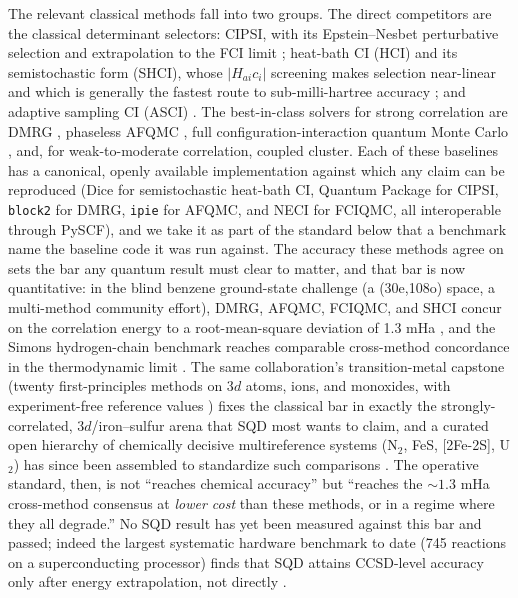 \documentclass[11pt]{article}
\begin{document}
The relevant classical methods fall into two groups. The direct competitors are the classical determinant selectors: CIPSI, with its Epstein--Nesbet perturbative selection and extrapolation to the FCI limit \cite{huron1973,garniron2019,loos2024}; heat-bath CI (HCI) and its semistochastic form (SHCI), whose $|H_{ai}c_i|$ screening makes selection near-linear and which is generally the fastest route to sub-milli-hartree accuracy \cite{holmes2016,sharma2017}; and adaptive sampling CI (ASCI) \cite{tubman2016}. The best-in-class solvers for strong correlation are DMRG \cite{white1992,chan2002}, phaseless AFQMC \cite{zhangs2003}, full configuration-interaction quantum Monte Carlo \cite{booth2009}, and, for weak-to-moderate correlation, coupled cluster. Each of these baselines has a canonical, openly available implementation against which any claim can be reproduced (Dice for semistochastic heat-bath CI, Quantum Package for CIPSI, \texttt{block2} for DMRG, \texttt{ipie} for AFQMC, and NECI for FCIQMC, all interoperable through PySCF), and we take it as part of the standard below that a benchmark name the baseline code it was run against. The accuracy these methods agree on sets the bar any quantum result must clear to matter, and that bar is now quantitative: in the blind benzene ground-state challenge (a (30e,108o) space, a multi-method community effort), DMRG, AFQMC, FCIQMC, and SHCI concur on the correlation energy to a root-mean-square deviation of 1.3 mHa \cite{eriksen2020}, and the Simons hydrogen-chain benchmark reaches comparable cross-method concordance in the thermodynamic limit \cite{motta2017}. The same collaboration's transition-metal capstone (twenty first-principles methods on 3$d$ atoms, ions, and monoxides, with experiment-free reference values \cite{williams2020}) fixes the classical bar in exactly the strongly-correlated, 3$d$/iron--sulfur arena that SQD most wants to claim, and a curated open hierarchy of chemically decisive multireference systems (N$_2$, FeS, [2Fe-2S], U$_2$) has since been assembled to standardize such comparisons \cite{sundar2026}. The operative standard, then, is not ``reaches chemical accuracy'' but ``reaches the ${\sim}1.3$ mHa cross-method consensus at \emph{lower cost} than these methods, or in a regime where they all degrade.'' No SQD result has yet been measured against this bar and passed; indeed the largest systematic hardware benchmark to date (745 reactions on a superconducting processor) finds that SQD attains CCSD-level accuracy only after energy extrapolation, not directly \cite{raisuddin2025}.
\end{document}
